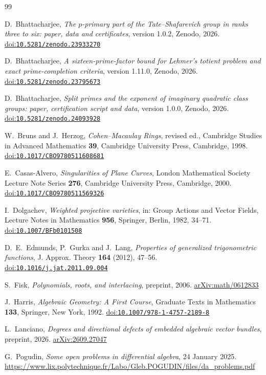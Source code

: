 \documentclass[11pt]{amsart}
\theoremstyle{definition}
\theoremstyle{remark}
\numberwithin{equation}{section}
\providecommand{\doi}[1]{\href{https://doi.org/#1}{doi:\nolinkurl{#1}}}
\begin{document}
\begingroup\raggedright
\begin{thebibliography}{99}

 D.~Bhattacharjee, \emph{The $p$-primary part of the Tate--Shafarevich group in ranks three to six: paper, data and certificates}, version 1.0.2, Zenodo, 2026. \doi{10.5281/zenodo.23933270}

 D.~Bhattacharjee, \emph{A sixteen-prime-factor bound for Lehmer's totient problem and exact prime-completion criteria}, version 1.11.0, Zenodo, 2026. \doi{10.5281/zenodo.23795673}

 D.~Bhattacharjee, \emph{Split primes and the exponent of imaginary quadratic class groups: paper, certification script and data}, version 1.0.0, Zenodo, 2026. \doi{10.5281/zenodo.24093928}

 W.~Bruns and J.~Herzog, \emph{Cohen--Macaulay Rings}, revised ed., Cambridge Studies in Advanced Mathematics \textbf{39}, Cambridge University Press, Cambridge, 1998. \doi{10.1017/CBO9780511608681}

 E.~Casas-Alvero, \emph{Singularities of Plane Curves}, London Mathematical Society Lecture Note Series \textbf{276}, Cambridge University Press, Cambridge, 2000. \doi{10.1017/CBO9780511569326}

 I.~Dolgachev, \emph{Weighted projective varieties}, in: Group Actions and Vector Fields, Lecture Notes in Mathematics \textbf{956}, Springer, Berlin, 1982, 34--71. \doi{10.1007/BFb0101508}

 D.~E.~Edmunds, P.~Gurka and J.~Lang, \emph{Properties of generalized trigonometric functions}, J. Approx. Theory \textbf{164} (2012), 47--56. \doi{10.1016/j.jat.2011.09.004}

 S.~Fisk, \emph{Polynomials, roots, and interlacing}, preprint, 2006. \href{https://arxiv.org/abs/math/0612833}{arXiv:math/0612833}

 J.~Harris, \emph{Algebraic Geometry: A First Course}, Graduate Texts in Mathematics \textbf{133}, Springer, New York, 1992. \doi{10.1007/978-1-4757-2189-8}

 L.~Lanciano, \emph{Degrees and directional defects of embedded algebraic vector bundles}, preprint, 2026. \href{https://arxiv.org/abs/2609.27047}{arXiv:2609.27047}

 G.~Pogudin, \emph{Some open problems in differential algebra}, 24 January 2025. \url{https://www.lix.polytechnique.fr/Labo/Gleb.POGUDIN/files/da_problems.pdf}


\end{thebibliography}
\end{document}
